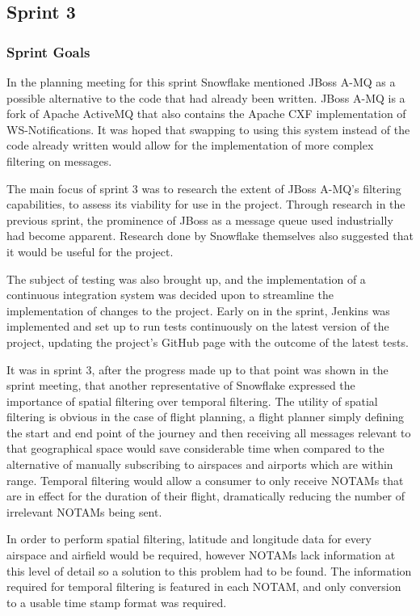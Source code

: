 \documentclass[a4paper, 12pt, twoside]{article}
\begin{document}
\subsection{Sprint 3}
\label{sec:impl_sprint_3}

\subsubsection{Sprint Goals}

In the planning meeting for this sprint Snowflake mentioned JBoss A-MQ as a possible alternative to the code that had already been written. JBoss A-MQ is a fork of Apache ActiveMQ that also contains the Apache CXF implementation of WS-Notifications. It was hoped that swapping to using this system instead of the code already written would allow for the implementation of more complex filtering on messages.

The main focus of sprint 3 was to research the extent of JBoss A-MQ's filtering capabilities, to assess its viability for use in the project. Through research in the previous sprint, the prominence of JBoss as a message queue used industrially had become apparent. Research done by Snowflake themselves also suggested that it would be useful for the project.

The subject of testing was also brought up, and the implementation of a continuous integration system was decided upon to streamline the implementation of changes to the project. Early on in the sprint, Jenkins was implemented and set up to run tests continuously on the latest version of the project, updating the project's GitHub page with the outcome of the latest tests.

It was in sprint 3, after the progress made up to that point was shown in the sprint meeting, that another representative of Snowflake expressed the importance of spatial filtering over temporal filtering. The utility of spatial filtering is obvious in the case of flight planning, a flight planner simply defining the start and end point of the journey and then receiving all messages relevant to that geographical space would save considerable time when compared to the alternative of manually subscribing to airspaces and airports which are within range. Temporal filtering would allow a consumer to only receive NOTAMs that are in effect for the duration of their flight, dramatically reducing the number of irrelevant NOTAMs being sent.

In order to perform spatial filtering, latitude and longitude data for every airspace and airfield would be required, however NOTAMs lack information at this level of detail so a solution to this problem had to be found. The information required for temporal filtering is featured in each NOTAM, and only conversion to a usable time stamp format was required.
\end{document}
